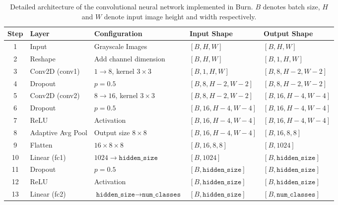 \documentclass{ieeeaccess}
\begin{document}
\begin{table}[t!]
\centering
\renewcommand{\arraystretch}{1.3}
\begin{tabular}{|c|l|l|l|l|}
\hline
\textbf{Step} & \textbf{Layer} & \textbf{Configuration} & \textbf{Input Shape} & \textbf{Output Shape} \\
\hline

1 & Input & Grayscale Images & 
$[B, H, W]$ &
$[B, H, W]$ \\

\hline
2 & Reshape & Add channel dimension &
$[B, H, W]$ &
$[B, 1, H, W]$ \\

\hline
3 & Conv2D (conv1) &
$1 \rightarrow 8$, kernel $3 \times 3$ &
$[B, 1, H, W]$ &
$[B, 8, H-2, W-2]$ \\

\hline
4 & Dropout &
$p = 0.5$ &
$[B, 8, H-2, W-2]$ &
$[B, 8, H-2, W-2]$ \\

\hline
5 & Conv2D (conv2) &
$8 \rightarrow 16$, kernel $3 \times 3$ &
$[B, 8, H-2, W-2]$ &
$[B, 16, H-4, W-4]$ \\

\hline
6 & Dropout &
$p = 0.5$ &
$[B, 16, H-4, W-4]$ &
$[B, 16, H-4, W-4]$ \\

\hline
7 & ReLU &
Activation &
$[B, 16, H-4, W-4]$ &
$[B, 16, H-4, W-4]$ \\

\hline
8 & Adaptive Avg Pool &
Output size $8 \times 8$ &
$[B, 16, H-4, W-4]$ &
$[B, 16, 8, 8]$ \\

\hline
9 & Flatten &
$16 \times 8 \times 8$ &
$[B, 16, 8, 8]$ &
$[B, 1024]$ \\

\hline
10 & Linear (fc1) &
$1024 \rightarrow \texttt{hidden\_size}$ &
$[B, 1024]$ &
$[B, \texttt{hidden\_size}]$ \\

\hline
11 & Dropout &
$p = 0.5$ &
$[B, \texttt{hidden\_size}]$ &
$[B, \texttt{hidden\_size}]$ \\

\hline
12 & ReLU &
Activation &
$[B, \texttt{hidden\_size}]$ &
$[B, \texttt{hidden\_size}]$ \\

\hline
13 & Linear (fc2) &
$\texttt{hidden\_size} \rightarrow \texttt{num\_classes}$ &
$[B, \texttt{hidden\_size}]$ &
$[B, \texttt{num\_classes}]$ \\

\hline
\end{tabular}
\caption{Detailed architecture of the convolutional neural network implemented in Burn. 
$B$ denotes batch size, $H$ and $W$ denote input image height and width respectively.}
\label{tab:burn-cnn-architecture}
\end{table}
\end{document}
